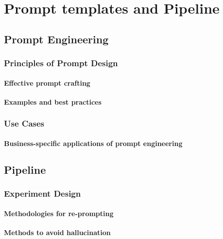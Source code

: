 \chapter{Prompt templates and Pipeline}

\section{Prompt Engineering}
\subsection{Principles of Prompt Design}
\subsubsection{Effective prompt crafting}
\subsubsection{Examples and best practices}

\subsection{Use Cases}
\subsubsection{Business-specific applications of prompt engineering}

\section{Pipeline}
\subsection{Experiment Design}
\subsubsection{Methodologies for re-prompting}
\subsubsection{Methods to avoid hallucination}
